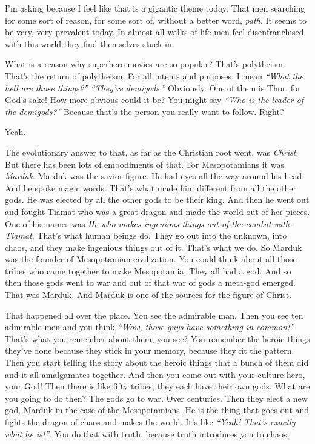 \documentclass{memoir}
\newcommand{\qq}[1]{\emph{“#1”}}
\begin{document}
\begin{drama}
\jrspeaks I’m asking because I feel like that is a gigantic theme today. That men searching for some sort of reason, for some sort of, without a better word, \emph{path}. It seems to be very, very prevalent today. In almost all walks of life men feel disenfranchised with this world they find themselves stuck in.

\jpspeaks What is a reason why superhero movies are so popular? That’s polytheism. That’s the return of polytheism. For all intents and purposes. I mean \qq{What the hell are those things?} \qq{They’re demigods.} Obviously. One of them is Thor, for God’s sake! How more obvious could it be? You might say \qq{Who is the leader of the demigods?} Because that’s the person you really want to follow. Right?

\jrspeaks Yeah.

\jpspeaks The evolutionary answer to that, as far as the Christian root went, was \emph{Christ}. But there has been lots of embodiments of that. For Mesopotamians it was \emph{Marduk}. Marduk was the savior figure. He had eyes all the way around his head. And he spoke magic words. That’s what made him different from all the other gods. He was elected by all the other gods to be their king. And then he went out and fought Tiamat who was a great dragon and made the world out of her pieces. One of his names was \emph{He-who-makes-ingenious-things-out-of-the-combat-with-Tiamat}. That’s what human beings do. They go out into the unknown, into chaos, and they make ingenious things out of it. That’s what we do. So Marduk was the founder of Mesopotamian civilization. You could think about all those tribes who came together to make Mesopotamia. They all had a god. And so then those gods went to war and out of that war of gods a meta-god emerged. That was Marduk. And Marduk is one of the sources for the figure of Christ.

That happened all over the place. You see the admirable man. Then you see ten admirable men and you think \qq{Wow, those guys have something in common!} That’s what you remember about them, you see? You remember the heroic things they’ve done because they stick in your memory, because they fit the pattern. Then you start telling the story about the heroic things that a bunch of them did and it all amalgamates together. And then you come out with your culture hero, your God! Then there is like fifty tribes, they each have their own gods. What are you going to do then? The gods go to war. Over centuries. Then they elect a new god, Marduk in the case of the Mesopotamians. He is the thing that goes out and fights the dragon of chaos and makes the world. It’s like \qq{Yeah! That’s exactly what he is!}. You do that with truth, because truth introduces you to chaos.


\end{drama}
\end{document}
